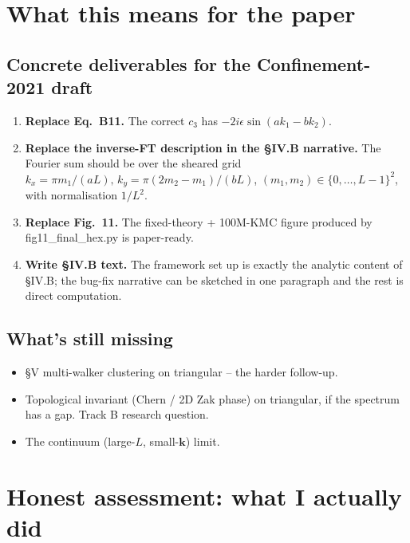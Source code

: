 \documentclass[11pt,a4paper]{article}
\newcommand{\vk}{\mathbf{k}}
\begin{document}
\section{What this means for the paper}\label{sec:paper}

\subsection{Concrete deliverables for the Confinement-2021 draft}\label{ssec:deliverables}

\begin{enumerate}[leftmargin=*]
\item \textbf{Replace Eq.~B11.} The correct $c_3$ has
  $-2 i \epsilon \sin(a k_1 - b k_2)$.
\item \textbf{Replace the inverse-FT description in the §IV.B narrative.}
  The Fourier sum should be over the sheared grid
  $k_x = \pi m_1/(aL),\, k_y = \pi(2 m_2 - m_1)/(b L)$,
  $(m_1, m_2) \in \{0,\dots,L-1\}^2$, with normalisation $1/L^2$.
\item \textbf{Replace Fig.~11.} The fixed-theory + 100M-KMC figure
  produced by {\sf fig11\_final\_hex.py} is paper-ready.
\item \textbf{Write §IV.B text.} The framework set up is exactly the
  analytic content of §IV.B; the bug-fix narrative can be sketched in
  one paragraph and the rest is direct computation.
\end{enumerate}

\subsection{What's still missing}\label{ssec:missing}

\begin{itemize}[leftmargin=*]
\item §V multi-walker clustering on triangular -- the harder follow-up.
\item Topological invariant (Chern / 2D Zak phase) on triangular,
  if the spectrum has a gap. Track B research question.
\item The continuum (large-$L$, small-$\vk$) limit.
\end{itemize}

\section{Honest assessment: what I actually did}\label{sec:honest}
\end{document}
